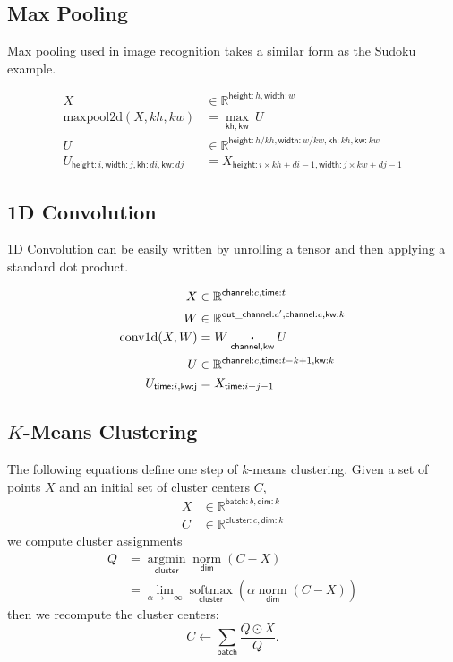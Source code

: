 \documentclass{article}
\newcommand{\name}[1]{\mathsf{#1}}
\newcommand{\ndot}[1]{\mathbin{\mathop{\thinspace\boldsymbol\cdot\thinspace}\limits_{\name{#1}}}}
\newcommand{\nsum}[1]{\mathop{\sum}_{\name{#1}}}
\newcommand{\nfun}[2]{\mathop{\text{#2}}\limits_{\name{#1}}}
\newcommand{\reals}{\mathbb{R}}
\begin{document}
\subsection{Max Pooling}

Max pooling used in image recognition takes a similar form as the Sudoku example.

\begin{align*} 
X &\in \reals^{\name{height}: h, \name{width}:w} \\
\text{maxpool2d}(X, kh, kw) &=  \nfun{kh, kw}{max}\  U \\
U &\in \reals^{{\name{height}:h / kh,
\name{width}:w / kw, \name{kh}:kh, \name{kw}:kw}}  \\
U_{\name{height}:i, \name{width}:j, \name{kh}:di, \name{kw}:dj  } & = X_{\name{height}:i \times kh + di -1, \name{width}:j \times kw + dj -1}  
\end{align*}



\subsection{1D Convolution}

1D Convolution can be easily written by unrolling a tensor and then
applying a standard dot product.

\begin{align*} 
X &\in \reals^{{\name{channel}:c, \name{time}:t}}  \\
W &\in \reals^{{\name{out\_channel}:c', \name{channel}:c, \name{kw}:k}}  \\
\text{conv1d}(X, W) &= W \ndot{channel, kw} U \\
U &\in \reals^{{\name{channel}:c, \name{time}:t-k +1, \name{kw}:k}}  \\
U_{\name{time}:i, \name{kw:j}} & = X_{\name{time}:i+j - 1}  
\end{align*} 


\subsection{$K$-Means Clustering}

The following equations define one step of $k$-means clustering. Given a set of points $X$ and an initial set of cluster centers $C$,
\begin{align*} 
X &\in \reals^{\name{batch}:b, \name{dim}:k} \\
C &\in \reals^{\name{cluster}:c, \name{dim}:k}
\end{align*}
we compute cluster assignments
\begin{align*}
Q &= \nfun{cluster}{argmin} \nfun{dim}{norm}(C-X) \\
  &= \lim_{\alpha \rightarrow -\infty} \nfun{cluster}{softmax} \left(\alpha \nfun{dim}{norm}(C-X)\right)
\end{align*}
then we recompute the cluster centers:
\begin{equation*}
C \leftarrow \nsum{batch} \frac{Q \odot X}{Q}.
\end{equation*}
\end{document}
